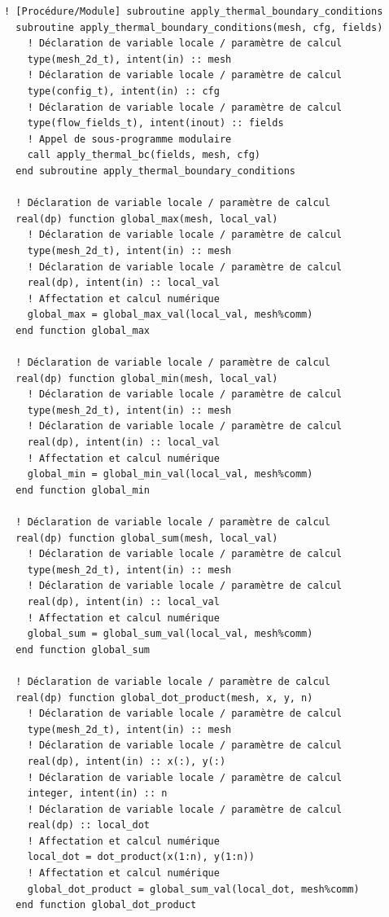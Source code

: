 \documentclass[10pt,a4paper,oneside]{book}
\begin{document}
\begin{lstlisting}[language={[95]Fortran}]
  ! [Procédure/Module] subroutine apply_thermal_boundary_conditions
  subroutine apply_thermal_boundary_conditions(mesh, cfg, fields)
    ! Déclaration de variable locale / paramètre de calcul
    type(mesh_2d_t), intent(in) :: mesh
    ! Déclaration de variable locale / paramètre de calcul
    type(config_t), intent(in) :: cfg
    ! Déclaration de variable locale / paramètre de calcul
    type(flow_fields_t), intent(inout) :: fields
    ! Appel de sous-programme modulaire
    call apply_thermal_bc(fields, mesh, cfg)
  end subroutine apply_thermal_boundary_conditions

  ! Déclaration de variable locale / paramètre de calcul
  real(dp) function global_max(mesh, local_val)
    ! Déclaration de variable locale / paramètre de calcul
    type(mesh_2d_t), intent(in) :: mesh
    ! Déclaration de variable locale / paramètre de calcul
    real(dp), intent(in) :: local_val
    ! Affectation et calcul numérique
    global_max = global_max_val(local_val, mesh%comm)
  end function global_max

  ! Déclaration de variable locale / paramètre de calcul
  real(dp) function global_min(mesh, local_val)
    ! Déclaration de variable locale / paramètre de calcul
    type(mesh_2d_t), intent(in) :: mesh
    ! Déclaration de variable locale / paramètre de calcul
    real(dp), intent(in) :: local_val
    ! Affectation et calcul numérique
    global_min = global_min_val(local_val, mesh%comm)
  end function global_min

  ! Déclaration de variable locale / paramètre de calcul
  real(dp) function global_sum(mesh, local_val)
    ! Déclaration de variable locale / paramètre de calcul
    type(mesh_2d_t), intent(in) :: mesh
    ! Déclaration de variable locale / paramètre de calcul
    real(dp), intent(in) :: local_val
    ! Affectation et calcul numérique
    global_sum = global_sum_val(local_val, mesh%comm)
  end function global_sum

  ! Déclaration de variable locale / paramètre de calcul
  real(dp) function global_dot_product(mesh, x, y, n)
    ! Déclaration de variable locale / paramètre de calcul
    type(mesh_2d_t), intent(in) :: mesh
    ! Déclaration de variable locale / paramètre de calcul
    real(dp), intent(in) :: x(:), y(:)
    ! Déclaration de variable locale / paramètre de calcul
    integer, intent(in) :: n
    ! Déclaration de variable locale / paramètre de calcul
    real(dp) :: local_dot
    ! Affectation et calcul numérique
    local_dot = dot_product(x(1:n), y(1:n))
    ! Affectation et calcul numérique
    global_dot_product = global_sum_val(local_dot, mesh%comm)
  end function global_dot_product


\end{lstlisting}
\end{document}
